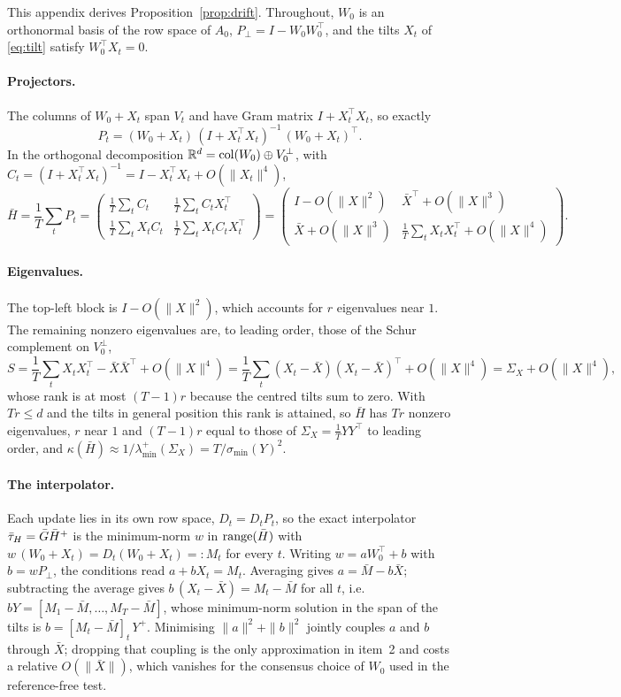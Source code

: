 This appendix derives Proposition~\ref{prop:drift}. Throughout, $W_0$ is an
orthonormal basis of the row space of $A_0$, $P_\perp = I - W_0W_0^\top$, and
the tilts $X_t$ of \eqref{eq:tilt} satisfy $W_0^\top X_t = 0$.

\paragraph{Projectors.} The columns of $W_0 + X_t$ span $V_t$ and have Gram
matrix $I + X_t^\top X_t$, so exactly
\[
  P_t = (W_0 + X_t)\,(I + X_t^\top X_t)^{-1}\,(W_0 + X_t)^\top .
\]
In the orthogonal decomposition $\mathbb{R}^d = \operatorname{col}(W_0) \oplus V_0^\perp$,
with $C_t = (I + X_t^\top X_t)^{-1} = I - X_t^\top X_t + O(\|X_t\|^4)$,
\[
  \bar H = \frac1T\sum_t P_t =
  \begin{pmatrix} \frac1T\sum_t C_t & \frac1T\sum_t C_t X_t^\top \\[2pt]
                  \frac1T\sum_t X_t C_t & \frac1T\sum_t X_t C_t X_t^\top \end{pmatrix}
  = \begin{pmatrix} I - O(\|X\|^2) & \bar X^\top + O(\|X\|^3) \\
                    \bar X + O(\|X\|^3) & \frac1T\sum_t X_t X_t^\top + O(\|X\|^4) \end{pmatrix}.
\]

\paragraph{Eigenvalues.} The top-left block is $I - O(\|X\|^2)$, which
accounts for $r$ eigenvalues near $1$. The remaining nonzero eigenvalues are,
to leading order, those of the Schur complement on $V_0^\perp$,
\[
  S = \frac1T\sum_t X_tX_t^\top - \bar X\bar X^\top + O(\|X\|^4)
    = \frac1T\sum_t (X_t - \bar X)(X_t - \bar X)^\top + O(\|X\|^4)
    = \Sigma_X + O(\|X\|^4),
\]
whose rank is at most $(T-1)r$ because the centred tilts sum to zero. With
$Tr \le d$ and the tilts in general position this rank is attained, so
$\bar H$ has $Tr$ nonzero eigenvalues, $r$ near $1$ and $(T-1)r$ equal to those
of $\Sigma_X = \tfrac1T YY^\top$ to leading order, and
$\kappa(\bar H) \approx 1/\lambda^{+}_{\min}(\Sigma_X) = T/\sigma_{\min}(Y)^2$.

\paragraph{The interpolator.} Each update lies in its own row space,
$D_t = D_tP_t$, so the exact interpolator $\bar{\tau}_H = \bar G \bar H^{+}$ is the
minimum-norm $w$ in $\operatorname{range}(\bar H)$ with $w\,(W_0 + X_t) = D_t(W_0 + X_t)
=: M_t$ for every $t$. Writing $w = aW_0^\top + b$ with
$b = wP_\perp$, the conditions read $a + bX_t = M_t$. Averaging gives
$a = \bar M - b\bar X$; subtracting the average gives
$b\,(X_t - \bar X) = M_t - \bar M$ for all $t$, i.e.
$bY = [M_1 - \bar M, \dots, M_T - \bar M]$, whose minimum-norm solution in the
span of the tilts is $b = [M_t - \bar M]_t\,Y^{+}$. Minimising $\|a\|^2 +
\|b\|^2$ jointly couples $a$ and $b$ through $\bar X$; dropping that coupling
is the only approximation in item~2 and costs a relative $O(\|\bar X\|)$,
which vanishes for the consensus choice of $W_0$ used in the reference-free
test.

